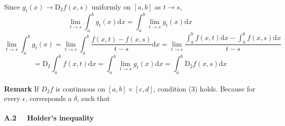 \documentclass[a4paper,12pt]{article}
\begin{document}
Since $g_t(x)\to \mathrm{D}_2 f(x, s)$ uniformly on $[a, b]$ as $t\to s$,
$$\lim_{t\to s}\int_a^b g_t(x) \mathrm{d}x = \int_a^b \lim_{t\to s} g_t(x) \mathrm{d}x $$
$$\lim_{t\to s}\int_a^b g_t(x) = \lim_{t\to s}\int_a^b \frac{f(x, t)-f(x, s)}{t-s} \mathrm{d}x = \lim_{t\to s} \frac{\int_a^b f(x, t) \mathrm{d}x - \int_a^b f(x, s) \mathrm{d}x}{t-s}$$
$$ = \mathrm{D}_2 \int_a^b f(x, t) \mathrm{d}x
= \int_a^b \lim_{t\to s} g_t(x) \mathrm{d}x = \int_a^b \mathrm{D}_2 f(x, s) \mathrm{d}x $$\\

\textbf{Remark}
If $D_2 f$ is continuous on $[a, b]\times [c, d]$, condition (3) holds. Because for every $\epsilon$, corresponds a $\delta$, such that

\paragraph{ A.2 \ \  Holder's inequality\\}
\end{document}
